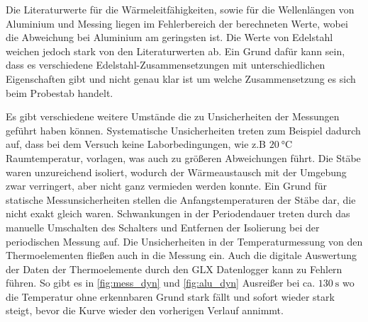 \noindent Die Literaturwerte für die Wärmeleitfähigkeiten, sowie für die Wellenlängen von Aluminium und Messing liegen im Fehlerbereich der berechneten Werte, wobei die Abweichung bei Aluminium am geringsten ist.
Die Werte von Edelstahl weichen jedoch stark von den Literaturwerten ab. Ein Grund dafür kann sein, dass es verschiedene Edelstahl-Zusammensetzungen mit unterschiedlichen
Eigenschaften gibt und nicht genau klar ist um welche Zusammensetzung es sich beim Probestab handelt.

\noindent Es gibt verschiedene weitere Umstände die zu Unsicherheiten der Messungen geführt haben können.
Systematische Unsicherheiten treten zum Beispiel dadurch auf, dass bei dem Versuch keine Laborbedingungen, wie z.B $\qty{20}{\degreeCelsius}$ Raumtemperatur, vorlagen, was auch zu größeren Abweichungen führt.
Die Stäbe waren unzureichend isoliert, wodurch der Wärmeaustausch mit der Umgebung zwar verringert, aber nicht ganz vermieden werden konnte.
Ein Grund für statische Messunsicherheiten stellen die Anfangstemperaturen der Stäbe dar, die nicht exakt gleich waren.
Schwankungen in der Periodendauer treten durch das manuelle Umschalten des Schalters und Entfernen der Isolierung bei der periodischen Messung auf.
Die Unsicherheiten in der Temperaturmessung von den Thermoelementen fließen auch in die Messung ein.
Auch die digitale Auswertung der Daten der Thermoelemente durch den GLX Datenlogger kann zu Fehlern führen.
So gibt es in \autoref{fig:mess_dyn} und \autoref{fig:alu_dyn} Ausreißer bei ca. $\qty{130}{\second}$ wo die Temperatur ohne erkennbaren Grund stark fällt und sofort wieder stark
steigt, bevor die Kurve wieder den vorherigen Verlauf annimmt.

 




